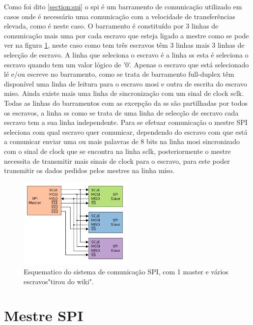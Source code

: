Como foi dito \ref{section:spi} o \acrshort{spi} é um barramento de comunicação utilizado em casos onde é necessário uma comunicação com a velocidade de transferências elevada, como é neste caso. O barramento é constituído por 3 linhas de comunicação mais uma por cada escravo que esteja ligado a mestre como se pode ver na figura \ref{fig:ligacoesSPI}, neste caso como tem três escravos têm 3 linhas mais 3 linhas de selecção de escravo. A linha que seleciona o escravo é a linha \acrshort{ss} esta é seleciona o escravo quando tem um valor lógico de '0'. Apenas o escravo que está selecionado lé e/ou escreve no barramento, como se trata de barramento full-duplex têm disponível uma linha de leitura para o escravo \acrshort{mosi}  e outra de escrita do escravo \acrshort{miso}. Ainda existe mais uma linha de sincronização com um sinal de clock \acrshort{sclk}. Todas as linhas do barramentos com as excepção da \acrshort{ss} são partilhadas por todos os escravos, a linha \acrshort{ss} como se trata de uma linha de selecção de escravo cada escravo tem a sua linha independente. Para se efetuar comunicação o mestre SPI seleciona com qual escravo quer comunicar, dependendo do escravo com que está a comunicar enviar uma ou mais palavras de 8 bits na linha \acrshort{mosi} sincronizado com o sinal de clock que se encontra na linha \acrshort{sclk}, posteriormente o mestre necessita de transmitir mais sinais de clock para o escravo, para este poder transmitir os dados pedidos pelos mestres na linha \acrshort{miso}.

\begin{figure}[!htb]
  \centering
  \includegraphics[width=0.50\textwidth]{Figures/SPI.png}
  \caption[Protocolo SPI]{Esquematico do sistema de comunicação SPI, com 1 master e vários escravos"tirou do wiki".}
  \label{fig:ligacoesSPI}
\end{figure}

\section{Mestre SPI}

